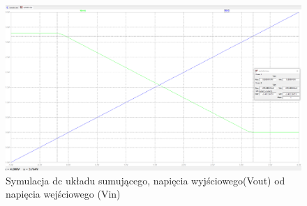     \begin{figure}[H]
        \centering
        \includegraphics[width=1\linewidth]{images/sumator_dc.png}
        \caption{Symulacja dc układu sumującego, napięcia wyjściowego(Vout) od napięcia wejściowego (Vin)}
    \end{figure}
